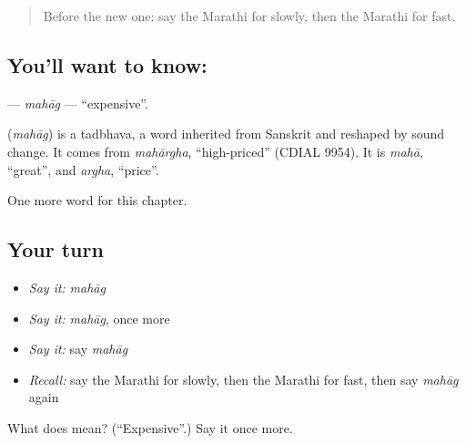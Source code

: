 \label{lesson:MR-C104-mahag}



\begin{quote}
Before the new one: say the Marathi for slowly, then the Marathi for fast.
\end{quote}

\subsection*{You'll want to know: }
\textbf{} — \emph{mahāg} — \textquotedblleft{}expensive\textquotedblright{}.

\begin{cousinweb}
\textbf{} (\emph{mahāg}) is a tadbhava, a word inherited from Sanskrit and reshaped by sound change. It comes from \emph{mahārgha}, \textquotedblleft{}high-priced\textquotedblright{} (CDIAL 9954). It is \emph{mahā}, \textquotedblleft{}great\textquotedblright{}, and \emph{argha}, \textquotedblleft{}price\textquotedblright{}.
\end{cousinweb}

\begin{grammarlens}[title={What you've built}]
One more word for this chapter.
\end{grammarlens}

\subsection*{Your turn}
\begin{itemize}
\raggedright
  \item \emph{Say it:} \emph{mahāg}
  \item \emph{Say it:} \emph{mahāg}, once more
  \item \emph{Say it:} say \emph{mahāg}
  \item \emph{Recall:} say the Marathi for slowly, then the Marathi for fast, then say \emph{mahāg} again
\end{itemize}

\begin{tcolorbox}[breakable,colback=teal!4,colframe=teal!35!black,title={Before you move on}]
What does  mean? (\textquotedblleft{}Expensive\textquotedblright{}.) Say it once more.
\end{tcolorbox}
